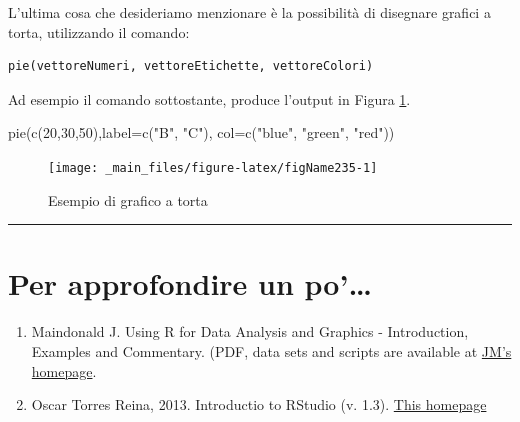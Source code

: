 \documentclass[a4paper,12pt,oneside]{book}
\providecommand{\tightlist}{%
  \setlength{\itemsep}{0pt}\setlength{\parskip}{0pt}}
\newenvironment{Shaded}{}{}
\newcommand{\KeywordTok}[1]{#1}
\newcommand{\DataTypeTok}[1]{#1}
\newcommand{\DecValTok}[1]{#1}
\newcommand{\StringTok}[1]{#1}
\newcommand{\NormalTok}[1]{#1}
\begin{document}
L'ultima cosa che desideriamo menzionare è la possibilità di disegnare grafici a torta, utilizzando il comando:

\begin{verbatim}
pie(vettoreNumeri, vettoreEtichette, vettoreColori)
\end{verbatim}

Ad esempio il comando sottostante, produce l'output in Figura \ref{fig:figName235}.

\begin{Shaded}
\begin{Highlighting}[]
\KeywordTok{pie}\NormalTok{(}\KeywordTok{c}\NormalTok{(}\DecValTok{20}\NormalTok{,}\DecValTok{30}\NormalTok{,}\DecValTok{50}\NormalTok{),}\DataTypeTok{label=}\KeywordTok{c}\NormalTok{(}\StringTok{"B"}\NormalTok{, }\StringTok{"C"}\NormalTok{),}
        \DataTypeTok{col=}\KeywordTok{c}\NormalTok{(}\StringTok{"blue"}\NormalTok{, }\StringTok{"green"}\NormalTok{, }\StringTok{"red"}\NormalTok{))}
\end{Highlighting}
\end{Shaded}

\begin{figure}

{\centering \texttt{[image: \_main\_files/figure-latex/figName235-1]} 

}

\caption{Esempio di grafico a torta}\label{fig:figName235}
\end{figure}

\begin{center}\rule{0.5\linewidth}{\linethickness}\end{center}

\hypertarget{per-approfondire-un-po-10}{%
\section{Per approfondire un po'\ldots{}}\label{per-approfondire-un-po-10}}

\begin{enumerate}
\def\labelenumi{\arabic{enumi}.}
\tightlist
\item
  Maindonald J. Using R for Data Analysis and Graphics - Introduction, Examples and Commentary. (PDF, data sets and scripts are available at \href{https://cran.r-project.org/doc/contrib/usingR.pdff}{JM's homepage}.
\item
  Oscar Torres Reina, 2013. Introductio to RStudio (v. 1.3). \href{https://dss.princeton.edu/training/RStudio101.pdf}{This homepage}
\end{enumerate}
\end{document}
